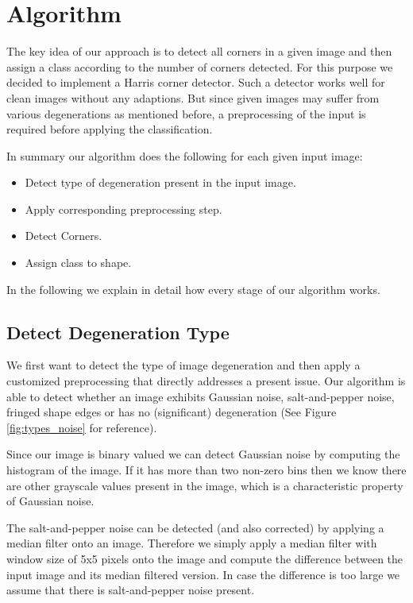 \documentclass[conference]{IEEEtran}
\begin{document}
\section{Algorithm}
The key idea of our approach is to detect all corners in a given image and then assign a class according to the number of corners detected. 
For this purpose we decided to implement a Harris corner detector\cite{Harris88acombined}. 
Such a detector works well for clean images without any adaptions.
But since given images may suffer from various degenerations as mentioned before, 
a preprocessing of the input is required before applying the classification. 

In summary our algorithm does the following for each given input image:
	\begin{itemize}
		\item Detect type of degeneration present in the input image.
		\item Apply corresponding preprocessing step.
		\item Detect Corners.
		\item Assign class to shape.
	\end{itemize}
	
In the following we explain in detail how every stage of our algorithm works.

\subsection{Detect Degeneration Type}
We first want to detect the type of image degeneration and then apply a customized preprocessing that directly addresses a present issue. 
Our algorithm is able to detect whether an image exhibits Gaussian noise, 
salt-and-pepper noise, fringed shape edges or has no (significant) degeneration
(See Figure \ref{fig:types_noise} for reference). 

Since our image is binary valued we can detect Gaussian noise by computing the histogram of the image. 
If it has more than two non-zero bins then we know there are other grayscale values present in the image, which is a characteristic property of Gaussian noise. 

The salt-and-pepper noise can be detected (and also corrected) by applying a median filter onto an image. 
Therefore we simply apply a median filter with window size of 5x5 pixels onto the image and compute the difference between the input image and its median filtered version. 
In case the difference is too large we assume that there is salt-and-pepper noise present. 
\end{document}
